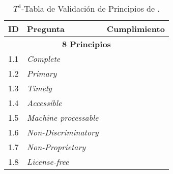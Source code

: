 \begin{table}[t]
\scriptsize
\renewcommand{\arraystretch}{1.3}
\begin{center}
\begin{tabular}[c]{|l|p{5cm}|c|} 
\hline
  \textbf{ID} & \textbf{Pregunta} &  \textbf{Cumplimiento}  \\\hline
  \multicolumn{3}{|c|}{\textbf{8 Principios}}  \\ \hline
   1.1& \textit{Complete} & \si  \\ \hline
   1.2&\textit{Primary} & \si  \\ \hline  
   1.3&\textit{Timely} & \si  \\ \hline  
   1.4&\textit{Accessible} & \si  \\ \hline  
   1.5&\textit{Machine processable} & \si  \\ \hline  
   1.6&\textit{Non-Discriminatory} & \si  \\ \hline  
   1.7&\textit{Non-Proprietary} &\si  \\ \hline
   1.8&\textit{License-free} & \si  \\ \hline                                                               
  \hline
  \end{tabular}
 \caption{$T^{4}$-Tabla de Validación de Principios de \opendata.}
  \label{table:validation-t4}
  \end{center}
\end{table} 



